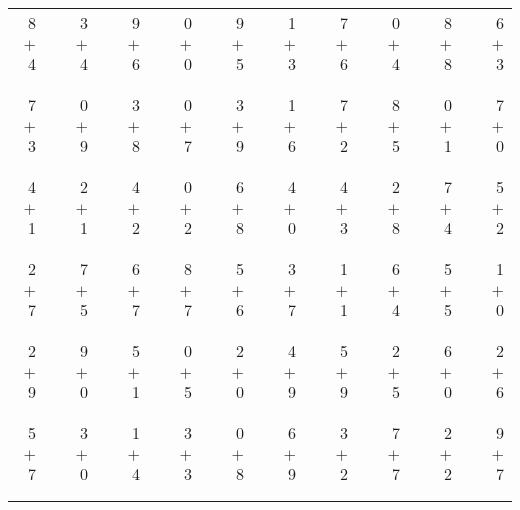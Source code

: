 \documentclass[12pt, letterpaper]{article}
\begin{document}
\begin{tabular}{rrrrrrrrrrrrrrrrrrr}
8 & & 3 & & 9 & & 0 & & 9 & & 1 & & 7 & & 0 & & 8 & & 6\\
$+$ 4 & & $+$ 4 & & $+$ 6 & & $+$ 0 & & $+$ 5 & & $+$ 3 & & $+$ 6 & & $+$ 4 & & $+$ 8 & & $+$ 3\\
\cline{1-1} \cline{3-3} \cline{5-5} \cline{7-7} \cline{9-9} \cline{11-11} \cline{13-13} \cline{15-15} \cline{17-17} \cline{19-19} \\ \\
7 & & 0 & & 3 & & 0 & & 3 & & 1 & & 7 & & 8 & & 0 & & 7\\
$+$ 3 & & $+$ 9 & & $+$ 8 & & $+$ 7 & & $+$ 9 & & $+$ 6 & & $+$ 2 & & $+$ 5 & & $+$ 1 & & $+$ 0\\
\cline{1-1} \cline{3-3} \cline{5-5} \cline{7-7} \cline{9-9} \cline{11-11} \cline{13-13} \cline{15-15} \cline{17-17} \cline{19-19} \\ \\
4 & & 2 & & 4 & & 0 & & 6 & & 4 & & 4 & & 2 & & 7 & & 5\\
$+$ 1 & & $+$ 1 & & $+$ 2 & & $+$ 2 & & $+$ 8 & & $+$ 0 & & $+$ 3 & & $+$ 8 & & $+$ 4 & & $+$ 2\\
\cline{1-1} \cline{3-3} \cline{5-5} \cline{7-7} \cline{9-9} \cline{11-11} \cline{13-13} \cline{15-15} \cline{17-17} \cline{19-19} \\ \\
2 & & 7 & & 6 & & 8 & & 5 & & 3 & & 1 & & 6 & & 5 & & 1\\
$+$ 7 & & $+$ 5 & & $+$ 7 & & $+$ 7 & & $+$ 6 & & $+$ 7 & & $+$ 1 & & $+$ 4 & & $+$ 5 & & $+$ 0\\
\cline{1-1} \cline{3-3} \cline{5-5} \cline{7-7} \cline{9-9} \cline{11-11} \cline{13-13} \cline{15-15} \cline{17-17} \cline{19-19} \\ \\
2 & & 9 & & 5 & & 0 & & 2 & & 4 & & 5 & & 2 & & 6 & & 2\\
$+$ 9 & & $+$ 0 & & $+$ 1 & & $+$ 5 & & $+$ 0 & & $+$ 9 & & $+$ 9 & & $+$ 5 & & $+$ 0 & & $+$ 6\\
\cline{1-1} \cline{3-3} \cline{5-5} \cline{7-7} \cline{9-9} \cline{11-11} \cline{13-13} \cline{15-15} \cline{17-17} \cline{19-19} \\ \\
5 & & 3 & & 1 & & 3 & & 0 & & 6 & & 3 & & 7 & & 2 & & 9\\
$+$ 7 & & $+$ 0 & & $+$ 4 & & $+$ 3 & & $+$ 8 & & $+$ 9 & & $+$ 2 & & $+$ 7 & & $+$ 2 & & $+$ 7\\
\cline{1-1} \cline{3-3} \cline{5-5} \cline{7-7} \cline{9-9} \cline{11-11} \cline{13-13} \cline{15-15} \cline{17-17} \cline{19-19} \\ \\

\end{tabular}
\end{document}
